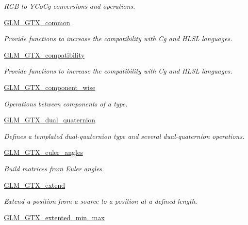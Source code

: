 \begin{DoxyCompactItemize}
\begin{DoxyCompactList}\small\item\em R\-G\-B to Y\-Co\-Cg conversions and operations. \end{DoxyCompactList}\item 
\hyperlink{group__gtx__common}{G\-L\-M\-\_\-\-G\-T\-X\-\_\-common}
\begin{DoxyCompactList}\small\item\em Provide functions to increase the compatibility with Cg and H\-L\-S\-L languages. \end{DoxyCompactList}\item 
\hyperlink{group__gtx__compatibility}{G\-L\-M\-\_\-\-G\-T\-X\-\_\-compatibility}
\begin{DoxyCompactList}\small\item\em Provide functions to increase the compatibility with Cg and H\-L\-S\-L languages. \end{DoxyCompactList}\item 
\hyperlink{group__gtx__component__wise}{G\-L\-M\-\_\-\-G\-T\-X\-\_\-component\-\_\-wise}
\begin{DoxyCompactList}\small\item\em Operations between components of a type. \end{DoxyCompactList}\item 
\hyperlink{group__gtx__dual__quaternion}{G\-L\-M\-\_\-\-G\-T\-X\-\_\-dual\-\_\-quaternion}
\begin{DoxyCompactList}\small\item\em Defines a templated dual-\/quaternion type and several dual-\/quaternion operations. \end{DoxyCompactList}\item 
\hyperlink{group__gtx__euler__angles}{G\-L\-M\-\_\-\-G\-T\-X\-\_\-euler\-\_\-angles}
\begin{DoxyCompactList}\small\item\em Build matrices from Euler angles. \end{DoxyCompactList}\item 
\hyperlink{group__gtx__extend}{G\-L\-M\-\_\-\-G\-T\-X\-\_\-extend}
\begin{DoxyCompactList}\small\item\em Extend a position from a source to a position at a defined length. \end{DoxyCompactList}\item 
\hyperlink{group__gtx__extented__min__max}{G\-L\-M\-\_\-\-G\-T\-X\-\_\-extented\-\_\-min\-\_\-max}

\end{DoxyCompactItemize}
